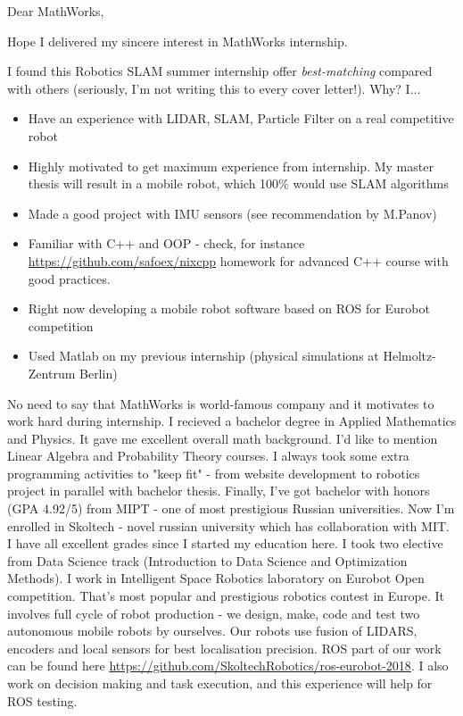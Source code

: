\documentclass[11pt,a4paper,roman]{moderncv}        %
\begin{document}
\date{\today}
\opening{Dear MathWorks,}
\closing{Hope I delivered my sincere interest in MathWorks internship.}
\makelettertitle
I found this Robotics SLAM summer internship offer \textit{best-matching} compared with others (seriously, I'm not writing this to every cover letter!). Why? I... 
\begin{itemize}
	\item Have an experience with \colorbox{RED!30}{LIDAR}, SLAM, Particle Filter on a real competitive robot
	\item Highly motivated to get maximum experience from internship. My master thesis will result in a mobile robot, which 100\% would use SLAM algorithms 	
	\item Made a good project with \colorbox{RED!30}{IMU} sensors (see recommendation by M.Panov)
	\item Familiar with \colorbox{RED!30}{C++} and OOP - check, for instance \url{https://github.com/safoex/nixcpp} homework for advanced C++ course with good practices. 
	\item Right now developing a mobile robot software based on ROS for Eurobot competition
	\item Used \colorbox{RED!30}{Matlab} on my previous internship (physical simulations at Helmoltz-Zentrum Berlin)
\end{itemize}
No need to say that MathWorks is world-famous company and it motivates to work hard during internship. 
\newline
\newline
I recieved a bachelor degree in Applied Mathematics and Physics. It gave me excellent overall math background. I'd like to mention Linear Algebra and Probability Theory courses. I always took some extra programming activities to "keep fit" - from website development to robotics project in parallel with bachelor thesis. Finally, I've got bachelor with honors (GPA \colorbox{RED!30}{4.92}/5) from MIPT - one of most prestigious Russian universities.
\newline
\newline
Now I'm enrolled in Skoltech - novel russian university which has collaboration with MIT. I have all excellent grades since I started my education here. I took two elective from Data Science track (Introduction to Data Science and Optimization Methods). I work in Intelligent Space Robotics laboratory on Eurobot Open competition. That's most popular and prestigious robotics contest in Europe. It involves full cycle of robot production - we design, make, code and test two autonomous mobile robots by ourselves. Our robots use fusion of LIDARS, encoders and local sensors for best localisation precision. ROS part of our work can be found here \url{https://github.com/SkoltechRobotics/ros-eurobot-2018}. I also work on decision making and task execution, and this experience will help for ROS testing. 
\end{document}
